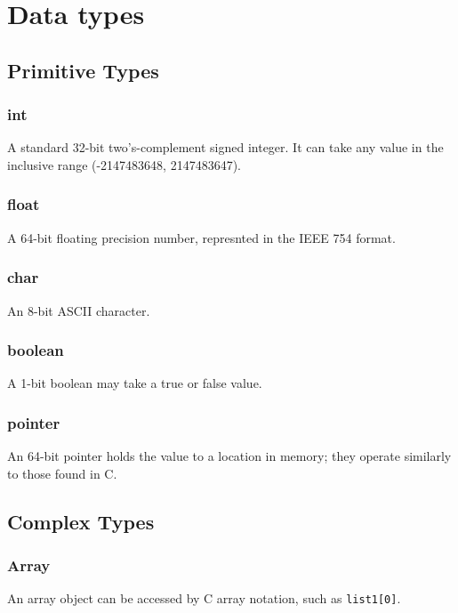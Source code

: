 \chapter{Data types}
    \section{Primitive Types}
        \subsection{int}
            A standard 32-bit two's-complement signed integer. It can take any value in the inclusive range (-2147483648, 2147483647).
        \subsection{float}
            A 64-bit floating precision number, represnted in the IEEE 754 format.            
        \subsection{char}
            An 8-bit ASCII character.  
        \subsection{boolean}
            A 1-bit boolean may take a true or false value. 
        \subsection{pointer}
            An 64-bit pointer holds the value to a location in memory; they operate similarly to those found in C.
    \section{Complex Types}
        \subsection{Array}
            An array object can be accessed by C array notation, such as \texttt{list1[0]}. 
 \iffalse       \subsection{struct}
            A struct is a simple user-defined data structure that holds various primitives, similar to the ones found in C. 
 \fi
